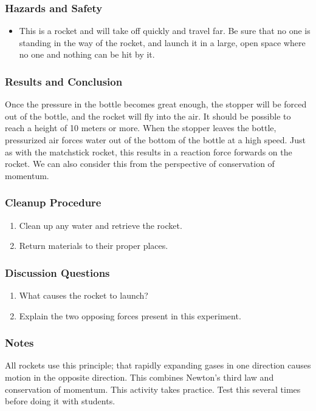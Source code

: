 \subsubsection*{Hazards and Safety}
\begin{itemize}
\item{This is a rocket and will take off quickly and travel far.  Be sure that no one is standing in the way of the rocket, and launch it in a large, open space where no one and nothing can be hit by it.}
\end{itemize}

\subsubsection*{Results and Conclusion}
Once the pressure in the bottle becomes great enough, the stopper will be forced out of the bottle, and the rocket will fly into the air. It should be possible to reach a height of 10 meters or more.  When the stopper leaves the bottle, pressurized air forces water out of the bottom of the bottle at a high speed. Just as with the matchstick rocket, this results in a reaction force forwards on the rocket.
We can also consider this from the perspective of conservation of momentum.

\subsubsection*{Cleanup Procedure}
\begin{enumerate}
\item{Clean up any water and retrieve the rocket.}
\item{Return materials to their proper places.}
\end{enumerate}

\subsubsection*{Discussion Questions}
\begin{enumerate}
\item{What causes the rocket to launch?}
\item{Explain the two opposing forces present in this experiment.}
\end{enumerate}

\subsubsection*{Notes}
All rockets use this principle; that rapidly expanding gases in one direction causes motion in the opposite direction.  This combines Newton's third law and conservation of momentum.
This activity takes practice.  Test this several times before doing it with students.  

